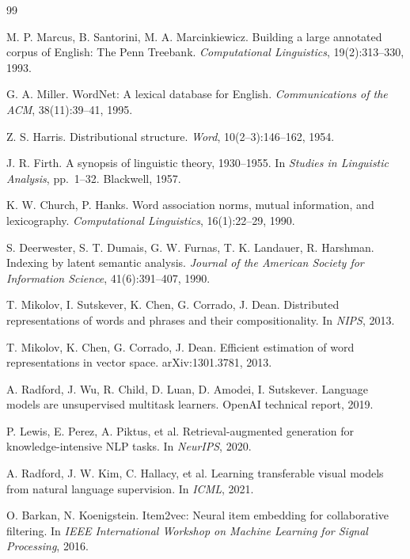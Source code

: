 \documentclass[11pt,a4paper]{article}
\begin{document}
\renewcommand{\refname}{참고문헌}
\begingroup
\small\raggedright
\setlength{\parskip}{0.15em}
\begin{thebibliography}{99}

 M. P. Marcus, B. Santorini, M. A. Marcinkiewicz.
Building a large annotated corpus of English: The Penn Treebank.
\emph{Computational Linguistics}, 19(2):313--330, 1993.

 G. A. Miller.
WordNet: A lexical database for English.
\emph{Communications of the ACM}, 38(11):39--41, 1995.

 Z. S. Harris.
Distributional structure.
\emph{Word}, 10(2--3):146--162, 1954.

 J. R. Firth.
A synopsis of linguistic theory, 1930--1955.
In \emph{Studies in Linguistic Analysis}, pp.~1--32. Blackwell, 1957.

 K. W. Church, P. Hanks.
Word association norms, mutual information, and lexicography.
\emph{Computational Linguistics}, 16(1):22--29, 1990.

 S. Deerwester, S. T. Dumais, G. W. Furnas, T. K. Landauer, R. Harshman.
Indexing by latent semantic analysis.
\emph{Journal of the American Society for Information Science}, 41(6):391--407, 1990.

 T. Mikolov, I. Sutskever, K. Chen, G. Corrado, J. Dean.
Distributed representations of words and phrases and their compositionality.
In \emph{NIPS}, 2013.

 T. Mikolov, K. Chen, G. Corrado, J. Dean.
Efficient estimation of word representations in vector space.
arXiv:1301.3781, 2013.

 A. Radford, J. Wu, R. Child, D. Luan, D. Amodei, I. Sutskever.
Language models are unsupervised multitask learners.
OpenAI technical report, 2019.

 P. Lewis, E. Perez, A. Piktus, et al.
Retrieval-augmented generation for knowledge-intensive NLP tasks.
In \emph{NeurIPS}, 2020.

 A. Radford, J. W. Kim, C. Hallacy, et al.
Learning transferable visual models from natural language supervision.
In \emph{ICML}, 2021.

 O. Barkan, N. Koenigstein.
Item2vec: Neural item embedding for collaborative filtering.
In \emph{IEEE International Workshop on Machine Learning for Signal Processing}, 2016.


\end{thebibliography}
\end{document}
